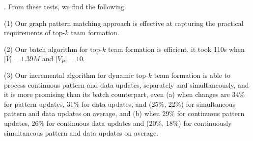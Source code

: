 . From these tests, we find the following.

\sstab(1) Our graph pattern matching approach is effective at capturing the practical requirements of top-$k$ team formation.

\sstab(2) Our batch algorithm for  top-$k$ team formation is efficient,
\eg it took 110s when $|V|=1.39M$ and $|V_P|=10$.

\sstab (3) Our incremental algorithm for dynamic top-$k$ team formation is able to process continuous pattern and data updates, separately and simultaneously,
and it is more promising than its batch counterpart,
even (a) when changes are 34\% for pattern updates, 31\% for data updates, and (25\%, 22\%) for simultaneous pattern and data updates on average,
and (b) when 29\% for continuous pattern updates, 26\% for continuous data updates and (20\%, 18\%) for continuously simultaneous pattern and data updates on average.
